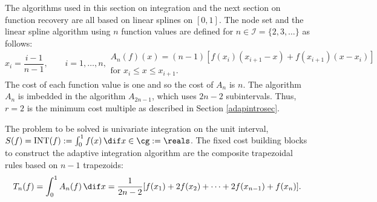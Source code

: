 The algorithms used in this section on integration and the next section on function recovery are all based on linear splines on $[0,1]$.  The node set and the linear spline algorithm using $n$ function values are defined for $n \in \mathcal{I}=\{2,3,\ldots\}$ as follows:
\begin{subequations} \label{linearspline}
\begin{equation}
x_i=\frac{i-1}{n-1}, \qquad i=1, \ldots, n,
\end{equation}
\begin{multline}
A_{n}(f)(x)=(n-1) \left[ f(x_{i})(x_{i+1}-x) +f(x_{i+1})(x-x_i) \right] \\ \text{for }x_i \leq x \leq x_{i+1}.
\end{multline}
\end{subequations}
The cost of each function value is one and so the cost of  $A_n$ is $n$. The algorithm $A_n$ is imbedded in the algorithm $A_{2n-1}$, which uses $2n-2$ subintervals.  Thus, $r=2$ is the minimum cost multiple as described in Section \ref{adapintrosec}.

The problem to be solved is univariate integration on the unit interval, $S(f)=\INT(f):=\int_{0}^{1}f(x) \, \dif x \in \cg := \reals$.  The fixed cost building blocks to construct the adaptive integration algorithm are the composite trapezoidal rules based on $n-1$ trapezoids:
\begin{equation*}
    T_{n}(f) = \int_0^1 A_n(f) \, \dif x 
    =\frac{1}{2n-2}[f(x_1)+2f(x_2)+\cdots+2f(x_{n-1})+f(x_n)].
\end{equation*} 

